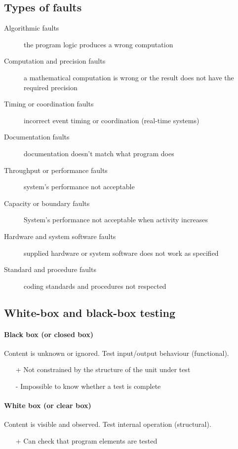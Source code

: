 \subsection{Types of faults}

\begin{description}
    \item[Algorithmic faults] the program logic produces a wrong computation
    \item[Computation and precision faults] a mathematical computation is wrong or the
    result does not have the required precision
    \item[Timing or coordination faults] incorrect event timing or coordination (real-time
    systems)
    \item[Documentation faults] documentation doesn't match what program does
    \item[Throughput or performance faults] system's performance not acceptable
    \item[Capacity or boundary faults] System's performance not acceptable when activity
    increases
    \item[Hardware and system software faults] supplied hardware or system software does
    not work as specified
    \item[Standard and procedure faults] coding standards and procedures not respected
\end{description}

\subsection{White-box and black-box testing}

\paragraph{Black box (or closed box)}

Content is unknown or ignored. \newline
Test input/output behaviour (functional).

\begin{itemize}
    \item[+] Not constrained by the structure of the unit under test
    \item[-] Impossible to know whether a test is complete
\end{itemize}

\paragraph{White box (or clear box)}

Content is visible and observed. \newline
Test internal operation (structural).

\begin{itemize}
    \item[+] Can check that program elements are tested
\end{itemize}
